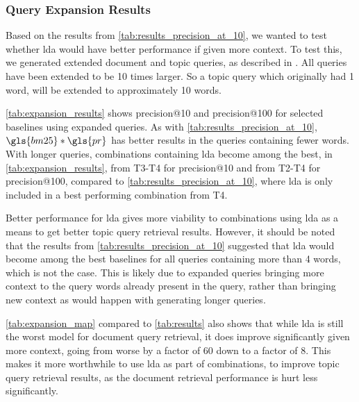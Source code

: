 \subsubsection{Query Expansion Results}

Based on the results from \autoref{tab:results_precision_at_10}, we wanted to test whether \gls{lda} would have better performance if given more context.
To test this, we generated extended document and topic queries, as described in .
All queries have been extended to be 10 times larger. 
So a topic query which originally had 1 word, will be extended to approximately 10 words.

\autoref{tab:expansion_results} shows precision@10 and precision@100 for selected baselines using expanded queries.
As with \autoref{tab:results_precision_at_10}, $\gls{bm25} * \gls{pr}$ has better results in the queries containing fewer words.
With longer queries, combinations containing \gls{lda} become among the best, in \autoref{tab:expansion_results}, from T3-T4 for precision@10 and from T2-T4 for precision@100, compared to \autoref{tab:results_precision_at_10}, where \gls{lda} is only included in a best performing combination from T4.

Better performance for \gls{lda} gives more viability to combinations using \gls{lda} as a means to get better topic query retrieval results.
However, it should be noted that the results from \autoref{tab:results_precision_at_10} suggested that \gls{lda} would become among the best baselines for all queries containing more than 4 words, which is not the case.
This is likely due to expanded queries bringing more context to the query words already present in the query, rather than bringing new context as would happen with generating longer queries.

\autoref{tab:expansion_map} compared to \autoref{tab:results} also shows that while \gls{lda} is still the worst model for document query retrieval, it does improve significantly given more context, going from worse by a factor of 60 down to a factor of 8.
This makes it more worthwhile to use \gls{lda} as part of combinations, to improve topic query retrieval results, as the document retrieval performance is hurt less significantly.  

